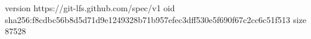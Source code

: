 version https://git-lfs.github.com/spec/v1
oid sha256:f8cdbc56b8d5d71d9e1249328b71b957efec3dff530e5f690f67c2cc6c51f513
size 87528
